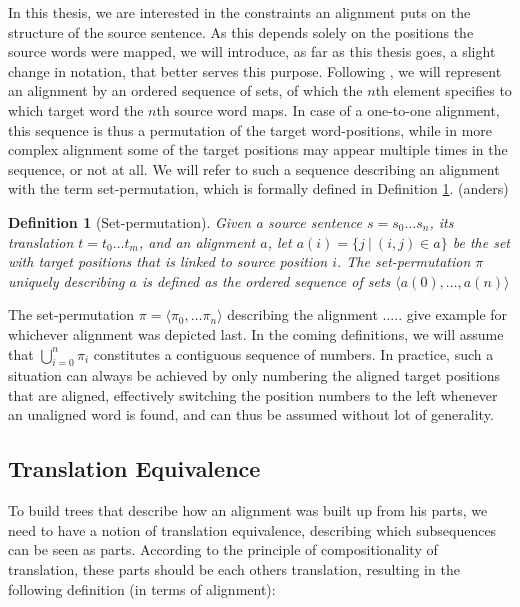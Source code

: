 \documentclass{report}
\theoremstyle{definition}
\theoremstyle{plain}
\newtheorem{definition}{Definition}
\begin{document}
In this thesis, we are interested in the constraints an alignment puts on the structure of the source sentence. As this depends solely on the positions the source words were mapped, we will introduce, as far as this thesis goes, a slight change in notation, that better serves this purpose. Following \cite{simaan2013hats}, we will represent an alignment by an ordered sequence of sets, of which the $n$th element specifies to which target word the $n$th source word maps. In case of a one-to-one alignment, this sequence is thus a permutation of the target word-positions, while in more complex alignment some of the target positions may appear multiple times in the sequence, or not at all. We will refer to such a sequence describing an alignment with the term set-permutation, which is formally defined in Definition \ref{def:sperm}. (anders)


\begin{definition}[Set-permutation]\label{def:sperm}
Given a source sentence $s = s_0 \ldots s_n$, its translation $t = t_0 \ldots t_m$, and an alignment $a$, let $a(i) = \{j~|~(i,j)\in a\}$ be the set with target positions that is linked to source position $i$. The set-permutation $\pi$ uniquely describing $a$ is defined as the ordered sequence of sets
$\langle a(0), \ldots, a(n) \rangle$
\end{definition}

The set-permutation $\pi=\langle \pi_0,\ldots\pi_n\rangle$ describing the alignment ..... give example for whichever alignment was depicted last. In the coming definitions, we will assume that $\bigcup_{i=0}^{n} \pi_i$ constitutes a contiguous sequence of numbers. In practice, such a situation can always be achieved by only numbering the aligned target positions that are aligned, effectively switching the position numbers to the left whenever an unaligned word is found, and can thus be assumed without lot of generality.


\subsection{Translation Equivalence}

To build trees that describe how an alignment was built up from his parts, we need to have a notion of translation equivalence, describing which subsequences can be seen as parts. According to the principle of compositionality of translation, these parts should be each others translation, resulting in the following definition (in terms of alignment):
\end{document}
